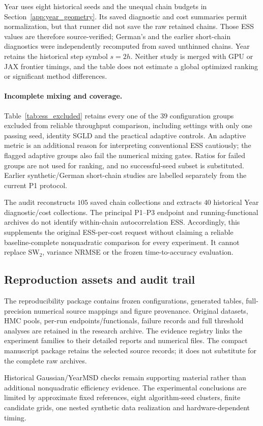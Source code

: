 Year uses eight historical seeds and the unequal chain budgets in Section~\ref{app:year_geometry}. Its saved diagnostic and cost summaries permit normalization, but that runner did not save the raw retained chains. Those ESS values are therefore source-verified; German's and the earlier short-chain diagnostics were independently recomputed from saved unthinned chains. Year retains the historical step symbol $s=2h$. Neither study is merged with GPU or JAX frontier timings, and the table does not estimate a global optimized ranking or significant method differences.

\FloatBarrier

\paragraph{Incomplete mixing and coverage.}
Table~\ref{tab:ess_excluded} retains every one of the $39$ configuration groups excluded from reliable throughput comparison, including settings with only one passing seed, identity SGLD and the practical adaptive controls. An adaptive metric is an additional reason for interpreting conventional ESS cautiously; the flagged adaptive groups also fail the numerical mixing gates. Ratios for failed groups are not used for ranking, and no successful-seed subset is substituted. Earlier synthetic/German short-chain studies are labelled separately from the current P1 protocol.


The audit reconstructs $105$ saved chain collections and extracts $40$ historical Year diagnostic/cost collections. The principal P1--P3 endpoint and running-functional archives do not identify within-chain autocorrelation ESS. Accordingly, this supplements the original ESS-per-cost request without claiming a reliable baseline-complete nonquadratic comparison for every experiment. It cannot replace SW$_2$, variance NRMSE or the frozen time-to-accuracy evaluation.

\FloatBarrier
\subsection{Reproduction assets and audit trail}\label{app:reproduce}
The reproducibility package contains frozen configurations, generated tables, full-precision numerical source mappings and figure provenance. Original datasets, HMC pools, per-run endpoints/functionals, failure records and full threshold analyses are retained in the research archive. The evidence registry links the experiment families to their detailed reports and numerical files. The compact manuscript package retains the selected source records; it does not substitute for the complete raw archives.

Historical Gaussian/YearMSD checks remain supporting material rather than additional nonquadratic efficiency evidence. The experimental conclusions are limited by approximate fixed references, eight algorithm-seed clusters, finite candidate grids, one nested synthetic data realization and hardware-dependent timing.
